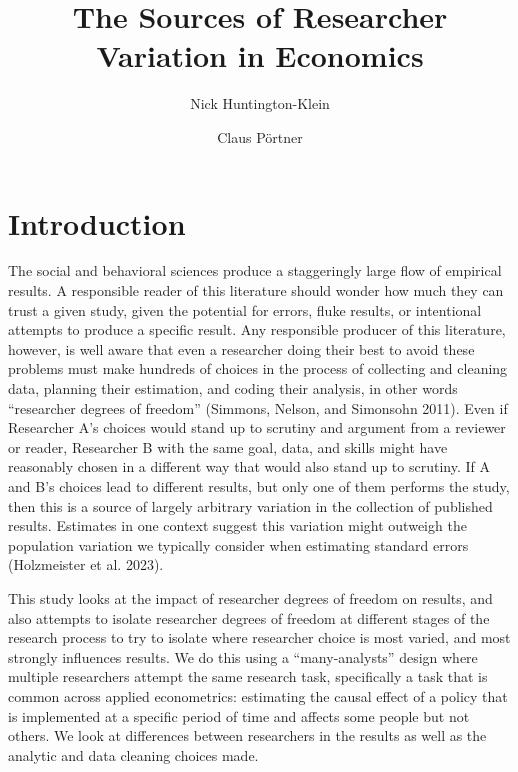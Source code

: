 \documentclass[
  letterpaper,
  DIV=11,
  numbers=noendperiod]{scrartcl}
\title{The Sources of Researcher Variation in Economics}
\author{Nick Huntington-Klein \and Claus Pörtner}
\date{}
\begin{document}
\maketitle
\ifdefined\Shaded\renewenvironment{Shaded}{\begin{tcolorbox}[sharp corners, frame hidden, enhanced, breakable, boxrule=0pt, interior hidden, borderline west={3pt}{0pt}{shadecolor}]}{\end{tcolorbox}}\fi

\hypertarget{introduction}{%
\section{Introduction}\label{introduction}}

The social and behavioral sciences produce a staggeringly large flow of
empirical results. A responsible reader of this literature should wonder
how much they can trust a given study, given the potential for errors,
fluke results, or intentional attempts to produce a specific result. Any
responsible producer of this literature, however, is well aware that
even a researcher doing their best to avoid these problems must make
hundreds of choices in the process of collecting and cleaning data,
planning their estimation, and coding their analysis, in other words
``researcher degrees of freedom'' (Simmons, Nelson, and Simonsohn 2011).
Even if Researcher A's choices would stand up to scrutiny and argument
from a reviewer or reader, Researcher B with the same goal, data, and
skills might have reasonably chosen in a different way that would also
stand up to scrutiny. If A and B's choices lead to different results,
but only one of them performs the study, then this is a source of
largely arbitrary variation in the collection of published results.
Estimates in one context suggest this variation might outweigh the
population variation we typically consider when estimating standard
errors (Holzmeister et al. 2023).

This study looks at the impact of researcher degrees of freedom on
results, and also attempts to isolate researcher degrees of freedom at
different stages of the research process to try to isolate where
researcher choice is most varied, and most strongly influences results.
We do this using a ``many-analysts'' design where multiple researchers
attempt the same research task, specifically a task that is common
across applied econometrics: estimating the causal effect of a policy
that is implemented at a specific period of time and affects some people
but not others. We look at differences between researchers in the
results as well as the analytic and data cleaning choices made.
\end{document}
